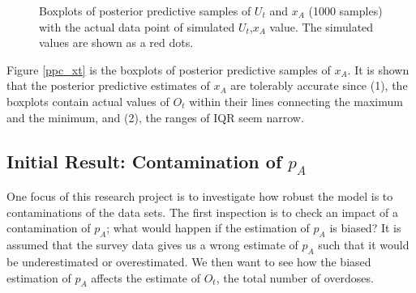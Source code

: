 \documentclass[12pt]{article}
\begin{document}
\begin{figure}[htb]
	\centering
	\caption[two early result box plots:]{Boxplots of posterior predictive samples of $U_t$ and $x_A$ (1000 samples) with the actual data point of simulated $U_t$,$x_A$ value. The simulated values are shown as a red dots.}
	
\end{figure}

Figure \ref{ppc_xt} is the boxplots of posterior predictive samples of $x_A$. It is shown that the posterior predictive estimates of $x_A$ are tolerably accurate since (1), the boxplots contain actual values of $O_t$ within their lines connecting the maximum and the minimum, and (2), the ranges of IQR seem narrow. \\



\subsection{Initial Result: Contamination of $p_A$ } 
One focus of this research project is to investigate how robust the model is to contaminations of the data sets. The first inspection is to check an impact of a contamination of $p_A$; what would happen if the estimation of $p_A$ is biased? It is assumed that the survey data gives us a wrong estimate of $p_A$ such that it would be underestimated or overestimated. We then want to see how the biased estimation of $p_A$ affects the estimate of $O_t$, the total number of overdoses.\\
\end{document}
